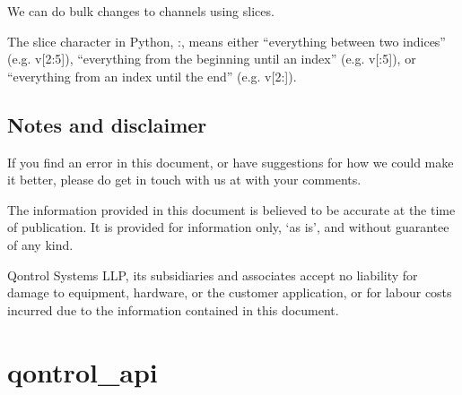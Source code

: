 \documentclass[letterpaper,10pt,english]{sphinxmanual}
\begin{document}
%
\begin{sphinxVerbatim}[commandchars=\\\{\}]
\PYG{p}{[}\PYG{p}{]}  
  \PYG{p}{[}\PYG{p}{]}
\end{sphinxVerbatim}

We can do bulk changes to channels using slices.

%
\begin{sphinxVerbatim}[commandchars=\\\{\}]
\PYG{p}{[}\PYG{p}{]}  
  \PYG{p}{[}\PYG{p}{]}
\end{sphinxVerbatim}

The slice character in Python, :, means either “everything between two indices” (e.g. v{[}2:5{]}), “everything from the beginning until an index” (e.g. v{[}:5{]}), or “everything from an index until the end” (e.g. v{[}2:{]}).


\section{Notes and disclaimer}
\label{\detokenize{guide/getting_started:notes-and-disclaimer}}
If you find an error in this document, or have suggestions for how we could make it better, please do get in touch with us at  with your comments.

The information provided in this document is believed to be accurate at the time of publication. It is provided for information only, ‘as is’, and without guarantee of any kind.

Qontrol Systems LLP, its subsidiaries and associates accept no liability for damage to equipment, hardware, or the customer application, or for labour costs incurred due to the information contained in this document.


\chapter{qontrol\_api}
\label{\detokenize{modules::doc}}\label{\detokenize{modules:qontrol-api}}
\end{document}
